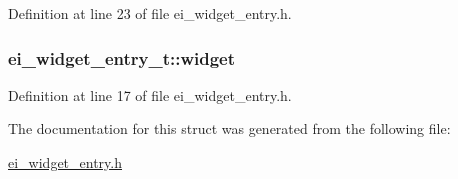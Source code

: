 Definition at line 23 of file ei\-\_\-widget\-\_\-entry.\-h.

\hypertarget{structei__widget__entry__t_a95a2762218ed376c16e12494625e3769}{
\subsubsection[{widget}]{ ei\-\_\-widget\-\_\-entry\-\_\-t\-::widget}}\label{structei__widget__entry__t_a95a2762218ed376c16e12494625e3769}


Definition at line 17 of file ei\-\_\-widget\-\_\-entry.\-h.



The documentation for this struct was generated from the following file\-:\begin{DoxyCompactItemize}
\item 
\hyperlink{ei__widget__entry_8h}{ei\-\_\-widget\-\_\-entry.\-h}\end{DoxyCompactItemize}

